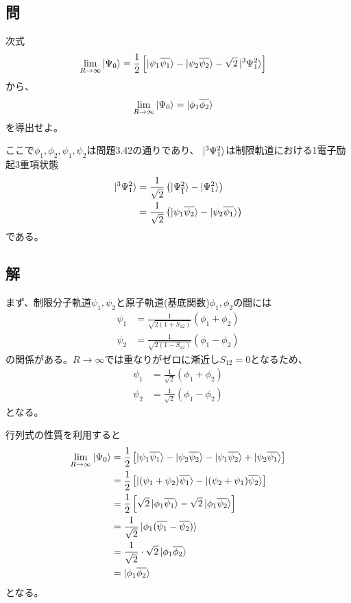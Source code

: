 \subsection{問}
次式
\begin{align}
	\lim_{R\rightarrow\infty}
		\ket{\Psi_0}
&=
	\frac{1}{2}
	\left[
		\ket{{\psi_1}{\overline{\psi_1}}}
		-
		\ket{{\psi_2}{\overline{\psi_2}}}
		-
		\sqrt{2}
		\ket{^3\Psi^2_1}
	\right]
\end{align}
から、
\begin{align}
	\lim_{R\rightarrow\infty}
		\ket{\Psi_0}
&=
	\ket{{\phi_1}{\overline{\phi_2}}}
\end{align}
を導出せよ。

ここで$\phi_1,\phi_2,\psi_1,\psi_2$は問題3.42の通りであり、
$\ket{^3\Psi_1^2}$は制限軌道における1電子励起3重項状態
\begin{align}
	\ket{^3\Psi_1^2}
&=
	\frac{1}{\sqrt{2}}
	\left(
		\ket{\Psi_{\borb{1}}^{\aorb{2}}}
		-
		\ket{\Psi_{\aorb{1}}^{\aorb{2}}}
	\right) \\
%
%
&=
	\frac{1}{\sqrt{2}}
	\left(
		\ket{\aorb{\psi_1}\borb{\psi_2}}
		-
		\ket{\aorb{\psi_2}\borb{\psi_1}}
	\right)
\end{align}
である。

\subsection{解}
まず、制限分子軌道$\psi_1,\psi_2$と原子軌道(基底関数)$\phi_1,\phi_2$の間には
\begin{align}
	\psi_1
&=
	\frac{1}{\sqrt{2(1+S_{12})}}
	(\phi_1 +\phi_2) \\
%
%
	\psi_2
&=
	\frac{1}{\sqrt{2(1-S_{12})}}
	(\phi_1 -\phi_2)
\end{align}
の関係がある。$R\rightarrow\infty$では重なりがゼロに漸近し$S_{12}=0$となるため、
\begin{align}
	\psi_1
&=
	\frac{1}{\sqrt{2}}
	(\phi_1 +\phi_2) \\
%
%
	\psi_2
&=
	\frac{1}{\sqrt{2}}
	(\phi_1 -\phi_2)
\end{align}
となる。

行列式の性質を利用すると
\begin{align}
	\lim_{R\rightarrow\infty}
		\ket{\Psi_0}
&=
	\frac{1}{2}
	\left[
		\ket{\aorb{\psi_1}\borb{\psi_1}}
		-
		\ket{\aorb{\psi_2}\borb{\psi_2}}
		-
		\ket{\aorb{\psi_1}\borb{\psi_2}}
		+
		\ket{\aorb{\psi_2}\borb{\psi_1}}
	\right] \\
%
%
&=
	\frac{1}{2}
	\left[
		\ket{(\aorb{\psi_1}+\aorb{\psi_2})\borb{\psi_1}}
		-
		\ket{(\aorb{\psi_2}+\aorb{\psi_1})\borb{\psi_2}}
	\right] \\
%
%
&=
	\frac{1}{2}
	\left[
		\sqrt{2} \ket{\aorb{\phi_1}\borb{\psi_1}}
		-
		\sqrt{2} \ket{\aorb{\phi_1}\borb{\psi_2}}
	\right] \\
%
%
&=
	\frac{1}{\sqrt{2}}
	\ket{\aorb{\phi_1}(\borb{\psi_1}-\borb{\psi_2})} \\
%
%
&=
	\frac{1}{\sqrt{2}} \cdot
	\sqrt{2} \ket{\aorb{\phi_1}\borb{\phi_2}} \\
%
%
&=
	\ket{\aorb{\phi_1}\borb{\phi_2}}
\end{align}
となる。
